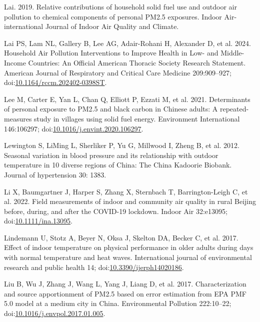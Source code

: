 \documentclass[
  letterpaper,
  DIV=11,
  numbers=noendperiod]{scrartcl}
\newlength{\cslhangindent}
\newenvironment{CSLReferences}[2] %
 {\begin{list}{}{%
  \setlength{\itemindent}{0pt}
  \setlength{\leftmargin}{0pt}
  \setlength{\parsep}{0pt}
  \ifodd #1
   \setlength{\leftmargin}{\cslhangindent}
   \setlength{\itemindent}{-1\cslhangindent}
  \fi
  \setlength{\itemsep}{#2\baselineskip}}}
 {\end{list}}
\begin{document}
\begin{CSLReferences}{1}{1}
Lai. 2019. Relative contributions of household solid fuel use and
outdoor air pollution to chemical components of personal {PM2}.5
exposures. Indoor Air-international Journal of Indoor Air Quality and
Climate.

Lai PS, Lam NL, Gallery B, Lee AG, Adair-Rohani H, Alexander D, et al.
2024. Household {Air Pollution Interventions} to {Improve Health} in
{Low-} and {Middle-Income Countries}: {An Official American Thoracic
Society Research Statement}. American Journal of Respiratory and
Critical Care Medicine 209:909--927;
doi:\href{https://doi.org/10.1164/rccm.202402-0398ST}{10.1164/rccm.202402-0398ST}.

Lee M, Carter E, Yan L, Chan Q, Elliott P, Ezzati M, et al. 2021.
Determinants of personal exposure to {PM2}.5 and black carbon in
{Chinese} adults: {A} repeated-measures study in villages using solid
fuel energy. Environment International 146:106297;
doi:\href{https://doi.org/10.1016/j.envint.2020.106297}{10.1016/j.envint.2020.106297}.

Lewington S, LiMing L, Sherliker P, Yu G, Millwood I, Zheng B, et al.
2012. Seasonal variation in blood pressure and its relationship with
outdoor temperature in 10 diverse regions of {China}: The {China
Kadoorie Biobank}. Journal of hypertension 30: 1383.

Li X, Baumgartner J, Harper S, Zhang X, Sternbach T, Barrington-Leigh C,
et al. 2022. Field measurements of indoor and community air quality in
rural {Beijing} before, during, and after the {COVID-19} lockdown.
Indoor Air 32:e13095;
doi:\href{https://doi.org/10.1111/ina.13095}{10.1111/ina.13095}.

Lindemann U, Stotz A, Beyer N, Oksa J, Skelton DA, Becker C, et al.
2017. Effect of indoor temperature on physical performance in older
adults during days with normal temperature and heat waves. International
journal of environmental research and public health 14;
doi:\href{https://doi.org/10.3390/ijerph14020186}{10.3390/ijerph14020186}.

Liu B, Wu J, Zhang J, Wang L, Yang J, Liang D, et al. 2017.
Characterization and source apportionment of {PM2}.5 based on error
estimation from {EPA PMF} 5.0 model at a medium city in {China}.
Environmental Pollution 222:10--22;
doi:\href{https://doi.org/10.1016/j.envpol.2017.01.005}{10.1016/j.envpol.2017.01.005}.


\end{CSLReferences}
\end{document}
